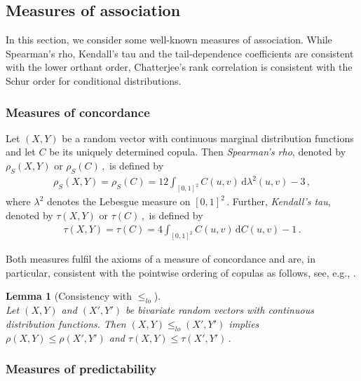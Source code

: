 \documentclass{article}
\newtheorem{lemma}[theorem]{Lemma}
\newcommand{\de}{\mathrm{\,d}}
\begin{document}
\subsection{Measures of association}\label{secmoca}

In this section, we consider some well-known measures of association.
While Spearman's rho, Kendall's tau and the tail-dependence coefficients are consistent with the lower orthant order, Chatterjee's rank correlation is consistent with the Schur order for conditional distributions.

\subsubsection{Measures of concordance}

Let \((X,Y)\) be a random vector with continuous marginal distribution functions and let \(C\) be its uniquely determined copula.
Then \emph{Spearman's rho}, denoted by \(\rho_S(X,Y)\) or \(\rho_S(C)\,,\) is defined by
\begin{align}\label{frm_rho_integral}
    \rho_S(X,Y)=\rho_S(C) = 12 \int_{[0,1]^2} C(u,v) \de \lambda^2(u,v) - 3\,,
\end{align}
where \(\lambda^2\) denotes the Lebesgue measure on \([0,1]^2\,.\)
Further, \emph{Kendall's tau}, denoted by \(\tau(X,Y)\) or \(\tau(C)\,,\) is defined by
\begin{align}\label{frm_tau_integral}
    \tau(X,Y) = \tau(C) = 4 \int_{[0,1]^2} C(u,v) \de C(u,v) - 1\,.
\end{align}

Both measures fulfil the axioms of a measure of concordance and are, in particular, consistent with the pointwise ordering of copulas as follows, see, e.g., \cite[Theorem 2.4.9]{Durante-2016}.

\begin{lemma}[Consistency with \(\leq_{lo}\)]\label{lemmoc}~\\
    Let \((X,Y)\) and \((X',Y')\) be bivariate random vectors with continuous distribution functions.
    Then \((X,Y)\leq_{lo} (X',Y')\) implies \(\rho(X,Y)\leq \rho (X',Y')\) and \(\tau(X,Y)\leq \tau(X',Y')\,.\)
\end{lemma}

\subsubsection{Measures of predictability}
\end{document}
